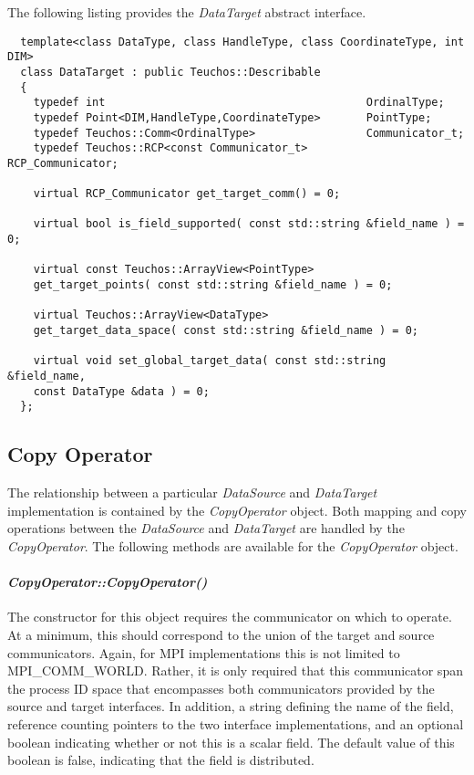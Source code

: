 \documentclass[letterpaper]{article}
\begin{document}
The following listing provides the {\sl DataTarget} abstract
interface. 

\begin{lstlisting}
  template<class DataType, class HandleType, class CoordinateType, int DIM>
  class DataTarget : public Teuchos::Describable
  {
    typedef int                                        OrdinalType;
    typedef Point<DIM,HandleType,CoordinateType>       PointType;
    typedef Teuchos::Comm<OrdinalType>                 Communicator_t;
    typedef Teuchos::RCP<const Communicator_t>         RCP_Communicator;

    virtual RCP_Communicator get_target_comm() = 0;

    virtual bool is_field_supported( const std::string &field_name ) = 0;

    virtual const Teuchos::ArrayView<PointType> 
    get_target_points( const std::string &field_name ) = 0;

    virtual Teuchos::ArrayView<DataType> 
    get_target_data_space( const std::string &field_name ) = 0;

    virtual void set_global_target_data( const std::string &field_name,
    const DataType &data ) = 0;
  };
\end{lstlisting}

\subsection{Copy Operator}
The relationship between a particular {\sl DataSource} and {\sl
  DataTarget} implementation is contained by the {\sl CopyOperator}
object. Both mapping and copy operations between the {\sl DataSource}
and {\sl DataTarget} are handled by the {\sl CopyOperator}. The
following methods are available for the {\sl CopyOperator} object.

\paragraph{\sl CopyOperator::CopyOperator()}
The constructor for this object requires the communicator on which to
operate. At a minimum, this should correspond to the union of the
target and source communicators. Again, for MPI implementations this
is not limited to MPI\_COMM\_WORLD. Rather, it is only required that
this communicator span the process ID space that encompasses both
communicators provided by the source and target interfaces. In
addition, a string defining the name of the field, reference counting
pointers to the two interface implementations, and an optional boolean
indicating whether or not this is a scalar field. The default value of
this boolean is false, indicating that the field is distributed.
\end{document}
